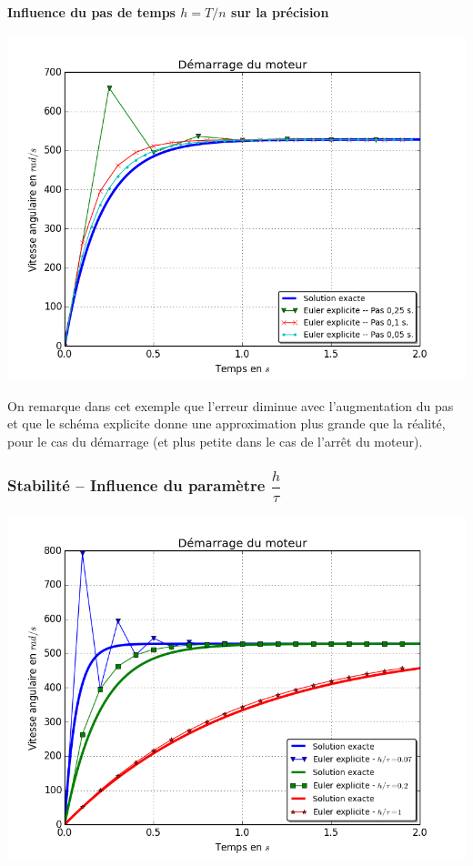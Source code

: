 \documentclass[10pt]{article}
\begin{document}
\paragraph*{Influence du pas de temps $h=T/n$ sur la précision}

\begin{center}
\includegraphics[width=.8\textwidth]{images/fig_07_bis}
\end{center}

On remarque dans cet exemple que l’erreur diminue avec l’augmentation du pas et que le schéma explicite donne une approximation plus grande que la réalité, pour le cas du démarrage (et plus petite dans le cas de l’arrêt du moteur).


\subsubsection{Stabilité -- Influence du paramètre $\dfrac{h}{\tau}$}

\begin{center}
\includegraphics[width=.8\textwidth]{images/fig_08_bis}
\end{center}
\end{document}

